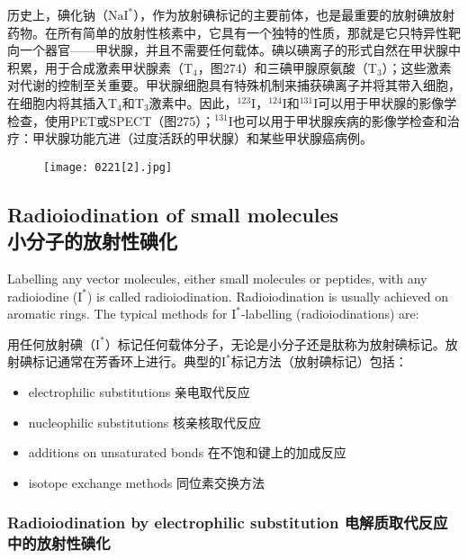\documentclass[dvipsnames, svgnames,a4paper,11pt]{article}
\begin{document}
历史上，碘化钠（\(\mathrm{NaI^*}\)），作为放射碘标记的主要前体，也是最重要的放射碘放射药物。在所有简单的放射性核素中，它具有一个独特的性质，那就是它只特异性靶向一个器官——甲状腺，并且不需要任何载体。碘以碘离子的形式自然在甲状腺中积累，用于合成激素甲状腺素（T${}_4$，图274）和三碘甲腺原氨酸（T${}_3$）；这些激素对代谢的控制至关重要。甲状腺细胞具有特殊机制来捕获碘离子并将其带入细胞，在细胞内将其插入T${}_4$和T${}_3$激素中。因此，\(\mathrm{^{123}I}\)，\(\mathrm{^{124}I}\)和\(\mathrm{^{131}I}\)可以用于甲状腺的影像学检查，使用PET或SPECT（图275）；\(\mathrm{^{131}I}\)也可以用于甲状腺疾病的影像学检查和治疗：甲状腺功能亢进（过度活跃的甲状腺）和某些甲状腺癌病例。  

\begin{figure}[h]
	\centering
    \texttt{[image: 0221[2].jpg]}  
     \label{fig275}
\end{figure}


\subsection{Radioiodination of small molecules\\ 小分子的放射性碘化}  
Labelling any vector molecules, either small molecules or peptides, with any radioiodine (\(\mathrm{I^*}\)) is called radioiodination. Radioiodination is usually achieved on aromatic rings. The typical methods for \(\mathrm{I^*}\)-labelling (radioiodinations) are:  

用任何放射碘（\(\mathrm{I^*}\)）标记任何载体分子，无论是小分子还是肽称为放射碘标记。放射碘标记通常在芳香环上进行。典型的\(\mathrm{I^*}\)标记方法（放射碘标记）包括：  

\begin{itemize}  
  \item electrophilic substitutions    亲电取代反应 
  \item nucleophilic substitutions   核亲核取代反应  
  \item additions on unsaturated bonds   在不饱和键上的加成反应
  \item isotope exchange methods  同位素交换方法
\end{itemize}


\subsubsection{Radioiodination by electrophilic substitution 电解质取代反应中的放射性碘化}  
\end{document}
